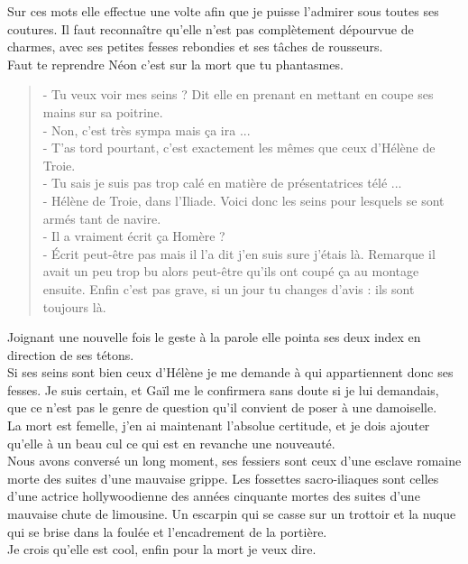 Sur ces mots elle effectue une volte afin que je puisse l'admirer sous toutes ses coutures. Il faut reconnaître qu'elle n'est pas complètement dépourvue de charmes, avec ses petites fesses rebondies et ses tâches de rousseurs. \\
Faut te reprendre Néon c'est sur la mort que tu phantasmes. \\

\begin{quote}
- Tu veux voir mes seins ? Dit elle en prenant en mettant en coupe ses mains sur sa poitrine. \\
- Non, c'est très sympa mais ça ira ... \\
- T'as tord pourtant, c'est exactement les mêmes que ceux d'Hélène de Troie. \\
- Tu sais je suis pas trop calé en matière de présentatrices télé ... \\
- Hélène de Troie, dans l'Iliade. Voici donc les seins pour lesquels se sont armés tant de navire. \\
- Il a vraiment écrit ça Homère ? \\
- Écrit peut-être pas mais il l'a dit j'en suis sure j'étais là. Remarque il avait un peu trop bu alors peut-être qu'ils ont coupé ça au montage ensuite. Enfin c'est pas grave, si un jour tu changes d'avis : ils sont toujours là. 
\end{quote}

Joignant une nouvelle fois le geste à la parole elle pointa ses deux index en direction de ses tétons. \\
Si ses seins sont bien ceux d'Hélène je me demande à qui appartiennent donc ses fesses. Je suis certain, et Gaïl me le confirmera sans doute si je lui demandais, que ce n'est pas le genre de question qu'il convient de poser à une damoiselle. \\
La mort est femelle, j'en ai maintenant l'absolue certitude, et je dois ajouter qu'elle à un beau cul ce qui est en revanche une nouveauté. \\

Nous avons conversé un long moment, ses fessiers sont ceux d'une esclave romaine morte des suites d'une mauvaise grippe. Les fossettes sacro-iliaques sont celles d'une actrice hollywoodienne des années cinquante mortes des suites d'une mauvaise chute de limousine. Un escarpin qui se casse sur un trottoir et la nuque qui se brise dans la foulée et l'encadrement de la portière. \\

Je crois qu'elle est cool, enfin pour la mort je veux dire. 